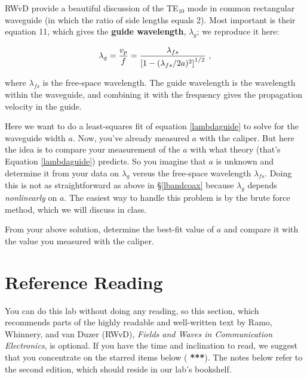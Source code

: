 \documentclass[11pt,preprint]{aastex}
\begin{document}
\noindent
	RWvD provide a beautiful discussion of the TE$_{10}$ mode in
common rectangular waveguide (in which the ratio of side lengths equals
2).  Most important is their equation 11, which gives the {\bf guide
wavelength}, $\lambda_g$; we reproduce it here:

\begin{equation} \label{lambdaguide}
\lambda_g = {v_p \over f} = {\lambda_{fs} \over \left[ 1 - (\lambda_{fs}/2a)^2
\right]^{1/2} } \ ,
\end{equation}

\noindent where $\lambda_{fs}$ is the free-space wavelength.  The guide
wavelength is the wavelength within the waveguide, and combining it with
the frequency gives the propagation velocity in the guide. 

Here we want to do a least-squares fit of equation \ref{lambdaguide} to
solve for the waveguide width $a$. Now, you've already measured $a$ with
the caliper. But here the idea is to compare your measurement of the
$a$ with what theory (that's Equation \ref{lambdaguide})
predicts. So you imagine that $a$ is unknown and determine it from your
data on $\lambda_g$ versus the free-space wavelength $\lambda_{fs}$.
Doing this is not as straightforward as above in \S \ref{lbandcoax}
because $\lambda_g$ depends {\it nonlinearly} on $a$. The easiest way to
handle
this problem is by the brute force method, which we will discuss in
class. 

	From your above solution, determine the best-fit value of $a$
and compare it with the value you measured with the caliper.

\section {Reference Reading} \label{RWvD}

\noindent
You can do this lab without doing any reading, so this section, which
recommends parts of the highly readable and well-written text by Ramo,
Whinnery, and van Duzer (RWvD), {\it Fields and Waves in Communication
  Electronics}, is optional. If you have the time and inclination to
read, we suggest that you concentrate on the starred items below ({\bf
  ***}).  The notes below refer to the second edition, which should
reside in our lab's bookshelf.
\end{document}
